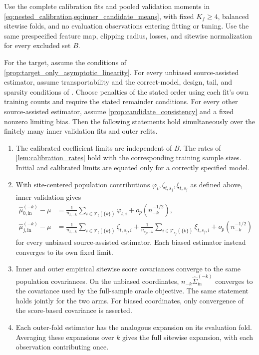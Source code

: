 \documentclass[12pt]{article}
\begin{document}
\begin{lemma}\label{lem:nested_validation}
Use the complete calibration fits and pooled validation moments in \cref{eq:nested_calibration,eq:inner_candidate_means}, with fixed $K_f\ge4$, balanced sitewise folds, and no evaluation observations entering fitting or tuning. Use the same prespecified feature map, clipping radius, losses, and sitewise normalization for every excluded set $B$.

For the target, assume the conditions of \cref{prop:target_only_asymptotic_linearity}. For every unbiased source-assisted estimator, assume transportability and the correct-model, design, tail, and sparsity conditions of . Choose penalties of the stated order using each fit's own training counts and require the stated remainder conditions. For every other source-assisted estimator, assume \cref{prop:candidate_consistency} and a fixed nonzero limiting bias. Then the following statements hold simultaneously over the finitely many inner validation fits and outer refits.
\begin{enumerate}[label=(\alph*),leftmargin=*]
\item The calibrated coefficient limits are independent of $B$. The rates of \cref{lem:calibration_rates} hold with the corresponding training sample sizes. Initial and calibrated limits are equated only for a correctly specified model.
\item With site-centered population contributions $\varphi_t,\zeta_{t,s_j},\xi_{t,s_j}$ as defined above, inner validation gives
\[
\begin{aligned}
\widehat\mu_{0,\mathrm{in}}^{(-k)}-\mu
&=\frac{1}{n_{t,-k}}\sum_{i\in\mathcal T_t(\{k\})}\varphi_{t,i}
+o_p(n_{-k}^{-1/2}),\\
\widehat\mu_{j,\mathrm{in}}^{(-k)}-\mu
&=\frac{1}{n_{t,-k}}\sum_{i\in\mathcal T_t(\{k\})}\zeta_{t,s_j,i}
+\frac{1}{n_{s_j,-k}}\sum_{i\in\mathcal T_{s_j}(\{k\})}\xi_{t,s_j,i}
+o_p(n_{-k}^{-1/2})
\end{aligned}
\]
for every unbiased source-assisted estimator. Each biased estimator instead converges to its own fixed limit.
\item Inner and outer empirical sitewise score covariances converge to the same population covariances. On the unbiased coordinates, $n_{-k}\widehat\Sigma_{\mathrm{in}}^{(-k)}$ converges to the covariance used by the full-sample oracle objective. The same statement holds jointly for the two arms. For biased coordinates, only convergence of the score-based covariance is asserted.
\item Each outer-fold estimator has the analogous expansion on its evaluation fold. Averaging these expansions over $k$ gives the full sitewise expansion, with each observation contributing once.
\end{enumerate}
\end{lemma}
\end{document}
